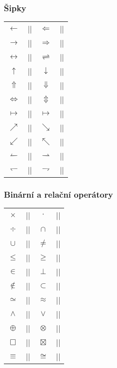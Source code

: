 \begin{frame}[fragile]
	\frametitle{Šipky}
	\begin{center}
		\begin{tabular}{clcl}
			$\leftarrow$ & |\leftarrow| & $\Leftarrow$ & |\Leftarrow|\\
			$\rightarrow$ & |\rightarrow| & $\Rightarrow$ & |\Rightarrow|\\
			$\leftrightarrow$ & |\leftrightarrow| & $\rightleftharpoons$ & |\rightleftharpoons|\\
			$\uparrow$ & |\uparrow| & $\downarrow$ & |\downarrow|\\
			$\Uparrow$ & |\Uparrow| & $\Downarrow$ & |\Downarrow|\\
			$\Leftrightarrow$ & |\Leftrightarrow| & $\Updownarrow$ & |\Updownarrow|\\
			$\mapsto$ & |\mapsto| & $\longmapsto$ & |\longmapsto|\\
			$\nearrow$ & |\nearrow| & $\searrow$ & |\searrow|\\
			$\swarrow$ & |\swarrow| & $\nwarrow$ & |\nwarrow|\\
			$\leftharpoonup$ & |\leftharpoonup| & $\rightharpoonup$ & |\rightharpoonup|\\
			$\leftharpoondown$ & |\leftharpoondown| & $\rightharpoondown$ & |\rightharpoondown|\\		
		\end{tabular}
	\end{center}
\end{frame}


\begin{frame}[fragile]
	\frametitle{Binární a relační operátory}
	\begin{center}
		\begin{tabular}{clcl}
			$\times$ & |\times| & $\cdot$ & |\cdot|\\
			$\div$ & |\div| & $\cap$ & |\cap|\\
			$\cup$ & |\cup| & $\neq$ & |\neq|\\
			$\leq$ & |\leq| & $\geq$ & |\geq|\\
			$\in$ & |\in| & $\perp$ & |\perp|\\
			$\notin$ & |\notin| & $\subset$ & |\subset|\\
			$\simeq$ & |\simeq| & $\approx$ & |\approx|\\
			$\wedge$ & |\wedge| & $\vee$ & |\vee|\\
			$\oplus$ & |\oplus| & $\otimes$ & |\otimes|\\
			$\Box$ & |\Box| & $\boxtimes$ & |\boxtimes|\\
			$\equiv$ & |\equiv| & $\cong$ & |\cong|\\
		\end{tabular}
	\end{center}
\end{frame}


